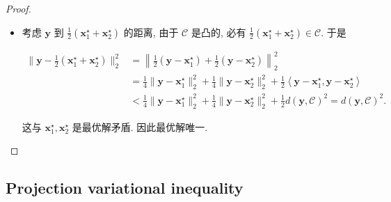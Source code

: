 \begin{thmblock}[{凸闭集上的投影存在唯一}]
\begin{proof}{}
\begin{itemize}
因此由第二式整理得

\[
\left\langle \bm{y} - \bm{x}_1^\star, \bm{y} - \bm{x}_2^\star \right\rangle = d(\bm{y}, \mathcal{C})^2 -\frac{1}{2}\|\bm{x}_1^\star - \bm{x}_2^\star\|_2^2 < d(\bm{y}, \mathcal{C})^2.
\]


\item {}考虑 $\bm{y}$ 到 $\frac{1}{2}(\bm{x}_1^\star + \bm{x}_2^\star)$ 的距离, 由于 $\mathcal{C}$ 是凸的, 必有 $\frac{1}{2}(\bm{x}_1^\star + \bm{x}_2^\star) \in \mathcal{C}$. 于是

\[
\begin{aligned}
  \|\bm{y} - \frac{1}{2}(\bm{x}_1^\star + \bm{x}_2^\star)\|_2^2 &= \left\|\frac{1}{2}(\bm{y}-\bm{x}_1^\star) + \frac{1}{2}(\bm{y}-\bm{x}_2^\star)\right\|_2^2\\
  &= \frac{1}{4}\|\bm{y}-\bm{x}_1^\star\|_2^2 + \frac{1}{4}\|\bm{y}-\bm{x}_2^\star\|_2^2 + \frac{1}{2}\left\langle \bm{y}-\bm{x}_1^\star, \bm{y}-\bm{x}_2^\star \right\rangle\\
  &< \frac{1}{4}\|\bm{y}-\bm{x}_1^\star\|_2^2 + \frac{1}{4}\|\bm{y}-\bm{x}_2^\star\|_2^2 + \frac12 d(\bm{y}, \mathcal{C})^2 = d(\bm{y}, \mathcal{C})^2.
\end{aligned}
\]

这与 $\bm{x}_1^\star, \bm{x}_2^\star$ 是最优解矛盾. 因此最优解唯一.


\end{itemize}

\end{proof}

\end{thmblock}

\subsection{Projection variational inequality}


